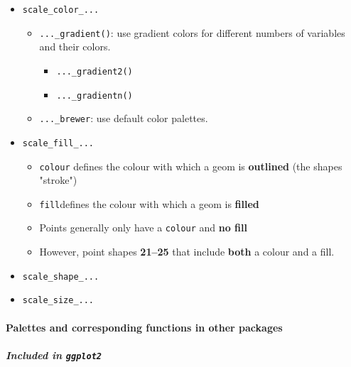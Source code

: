 \documentclass[
]{article}
\begin{document}
\begin{itemize}
\item
  \texttt{scale\_color\_...}

  \begin{itemize}
  \item
    \texttt{...\_gradient()}: use gradient colors for different numbers
    of variables and their colors.

    \begin{itemize}
    \item
      \texttt{...\_gradient2()}
    \item
      \texttt{...\_gradientn()}
    \end{itemize}
  \item
    \texttt{...\_brewer}: use default color palettes.
  \end{itemize}
\item
  \texttt{scale\_fill\_...}

  \begin{itemize}
  \item
    \texttt{colour} defines the colour with which a geom is
    \textbf{outlined} (the shape\textquotesingle s "stroke")
  \end{itemize}

  \begin{itemize}
  \item
    \texttt{fill}defines the colour with which a geom is \textbf{filled}
  \item
    Points generally only have a \texttt{colour} and \textbf{no fill}
  \item
    However, point shapes \textbf{21--25} that include \textbf{both} a
    colour and a fill.
  \end{itemize}
\item
  \texttt{scale\_shape\_...}
\item
  \texttt{scale\_size\_...}
\end{itemize}

\hypertarget{palettes-and-corresponding-functions-in-other-packages}{%
\paragraph{Palettes and corresponding functions in other
packages}\label{palettes-and-corresponding-functions-in-other-packages}}

\hypertarget{included-in-ggplot2}{%
\subparagraph{\texorpdfstring{Included in
\texttt{ggplot2}}{Included in ggplot2}}\label{included-in-ggplot2}}
\end{document}

